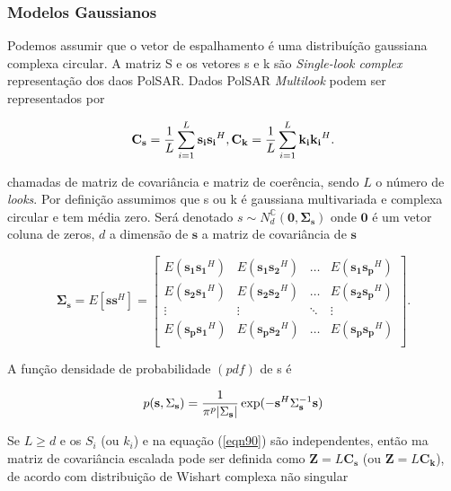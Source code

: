 \subsubsection{Modelos Gaussianos}


Podemos assumir que o vetor de espalhamento é uma distribuíção gaussiana complexa circular. A matriz {\boldmath S} e os vetores {\boldmath s} e {\boldmath k} são {\it Single-look complex} representação dos daos PolSAR. Dados PolSAR {\it Multilook} podem ser representados por
 
\begin{equation}\label{eqn90}
	\mathbf{C_{\mathbf s}}=\frac{1}{L}\sum_{i=1}^{L} \mathbf{s_i s_i}^H ,
	\mathbf{C_{\mathbf k}}=\frac{1}{L}\sum_{i=1}^{L} \mathbf{k_i k_i}^H . \\
\end{equation}

chamadas de matriz de covariância e matriz de coerência, sendo $L$ o número de {\it looks}. Por definição assumimos que {\boldmath s} ou {\boldmath k} é gaussiana multivariada e complexa circular e tem média zero. Será denotado $s\sim N_d^\mathbb{C}(\mathbf{0, \Sigma_{s}})$ onde $\mathbf{0}$ é um vetor coluna de zeros, $d$ a dimensão de $\mathbf{s}$ a matriz de covariância de $\mathbf{s}$  

\begin{equation}\label{eqn91}
	\mathbf{\Sigma_{\mathbf{s}}} = E[\mathbf{s}\mathbf{s}^H] =\left[
\begin{array}{cccc}
	E(\mathbf{s_1s_1}^H)  & E(\mathbf{s_1s_2}^H) &\hdots & E(\mathbf {s_1s_p}^H) \\
	E(\mathbf{s_2 s_1}^H)  & E(\mathbf{ s_2 s_2}^H) &\hdots &E(\mathbf{s_2 s_p}^H)\\
        \vdots&\vdots &\ddots &\vdots\\
	E(\mathbf{s_p s_1}^H)  & E(\mathbf{s_ps_2}^H) &\hdots &E(\mathbf{s_p s_p}^H)\\
\end{array}
\right].
\end{equation}

A função densidade de probabilidade $(pdf)$ de {\boldmath s} é 

\begin{equation}\label{eqn92}
	p(\mathbf{s},\Sigma_{\mathbf{s}})=\frac{1}{\pi^p|\Sigma_{\mathbf{s}}|}\exp(-\mathbf{s}^{H}\Sigma_{\mathbf{s}}^{-1}\mathbf{s})  \\
\end{equation}

Se $L\geq d$ e os {\boldmath$S_i$} (ou {\boldmath$k_i$}) e na equação (\ref{eqn90}) são independentes, então ma matriz de covariância escalada pode ser definida como $\mathbf{Z}=L\mathbf{C_{\mathbf s}}$ (ou $\mathbf{Z}=L\mathbf{C_k}$), de acordo com distribuição de Wishart complexa não singular \cite{good}

